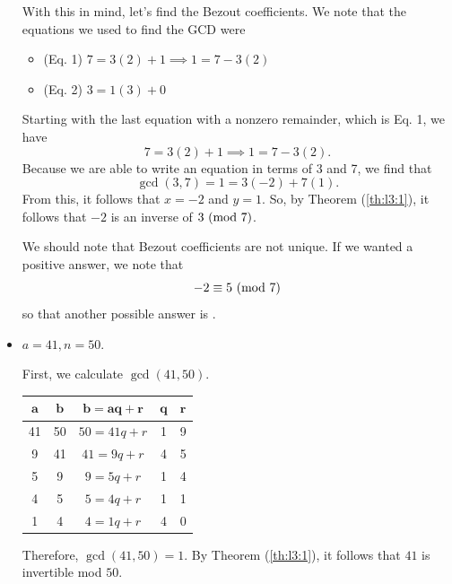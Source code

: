 \documentclass[letterpaper]{article}
\newcommand{\0}{\mathbf{0}}
\begin{document}
\begin{mdframed}
\begin{itemize}
\begin{mdframed}
            With this in mind, let's find the Bezout coefficients. We note that the equations we used to find the GCD were
            \begin{itemize}
                \item (Eq. 1) $7 = 3(2) + 1 \implies 1 = 7 - 3(2)$
                \item (Eq. 2) $3 = 1(3) + 0$
            \end{itemize}
            Starting with the last equation with a nonzero remainder, which is Eq. 1, we have 
            \[7 = 3(2) + 1 \implies 1 = 7 - 3(2).\]
            Because we are able to write an equation in terms of 3 and 7, we find that 
            \[\gcd(3, 7) = 1 = 3(-2) + 7(1).\]
            From this, it follows that $x = -2$ and $y = 1$. So, by Theorem (\ref{th:l3:1}), it follows that $-2$ is an inverse of $3 \ (\mathrm{mod}\ 7)$. 

            \bigskip 

            We should note that Bezout coefficients are not unique. If we wanted a positive answer, we note that 
            \[-2 \equiv 5 \ (\mathrm{mod}\ 7)\]
            so that another possible answer is .
        \end{mdframed}

        \item $a = 41, n = 50$.
        \begin{mdframed}
            First, we calculate $\gcd(41, 50)$. 
            \begin{center}
                \begin{tabular}{|c|c|c|c|c|}
                    \hline 
                    $\mathbf{a}$ & $\mathbf{b}$ & $\mathbf{b = aq + r}$ & $\mathbf{q}$ & $\mathbf{r}$ \\ 
                    \hline 
                    41 & 50 & $50 = 41q + r$ & 1 & 9 \\ 
                    9 & 41 & $41 = 9q + r$ & 4 & 5 \\ 
                    5 & 9 & $9 = 5q + r$ & 1 & 4 \\ 
                    4 & 5 & $5 = 4q + r$ & 1 & 1 \\ 
                    1 & 4 & $4 = 1q + r$ & 4 & 0 \\ 
                    \hline 
                \end{tabular}
            \end{center}
            Therefore, $\gcd(41, 50) = 1$. By Theorem (\ref{th:l3:1}), it follows that $41$ is invertible mod $50$.


\end{mdframed}
\end{itemize}
\end{mdframed}
\end{document}
